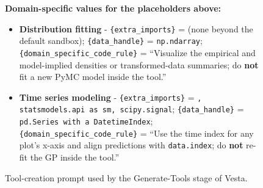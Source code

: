 \documentclass{article}
\newcommand{\method}{{\sc Vesta}}
\begin{document}
\begin{figure}[h]
\begin{mdframed}[linecolor=gray!50, backgroundcolor=gray!5, linewidth=0.8pt]
\medskip
\textbf{Domain-specific values for the placeholders above:}
\begin{itemize}[leftmargin=*, nosep]
    \item \textbf{Distribution fitting} -
          \texttt{\{extra\_imports\}} = (none beyond the default sandbox);
          \texttt{\{data\_handle\}} = \texttt{np.ndarray};
          \texttt{\{domain\_specific\_code\_rule\}} = ``Visualize the
          empirical and model-implied densities or transformed-data
          summaries; do \textbf{not} fit a new PyMC model inside the tool.''
    \item \textbf{Time series modeling} -
          \texttt{\{extra\_imports\}} = \texttt{, statsmodels.api as sm,
          scipy.signal};
          \texttt{\{data\_handle\}} = \texttt{pd.Series with a DatetimeIndex};
          \texttt{\{domain\_specific\_code\_rule\}} = ``Use the time index
          for any plot's x-axis and align predictions with
          \texttt{data.index}; do \textbf{not} re-fit the GP inside the
          tool.''
\end{itemize}

\end{mdframed}
\caption{Tool-creation prompt used by the Generate-Tools stage of \method{}.}
\label{fig:vesta-tool-creation-prompt}
\end{figure}
\end{document}

